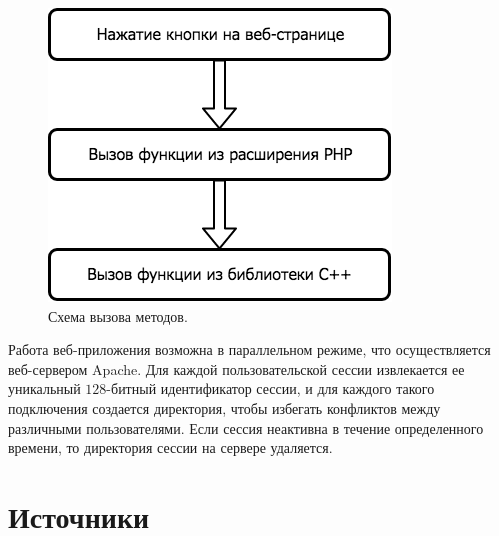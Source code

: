 \documentclass[14pt,a4paper]{article}
\begin{document}
\begin{figure}[H]
\centering
\includegraphics[scale=0.5]{img/diagram.png}
\caption{Схема вызова методов.}
\label{fig:diagram}
\end{figure}

Работа веб-приложения возможна в параллельном режиме, что осуществляется веб-сервером Apache. Для каждой пользовательской сессии извлекается ее уникальный $128$-битный идентификатор сессии, и для каждого такого подключения создается директория, чтобы избегать конфликтов между различными пользователями. Если сессия неактивна в течение определенного времени, то директория сессии на сервере удаляется.

\newpage

\section[Источники]{\huge Источники}
\end{document}
